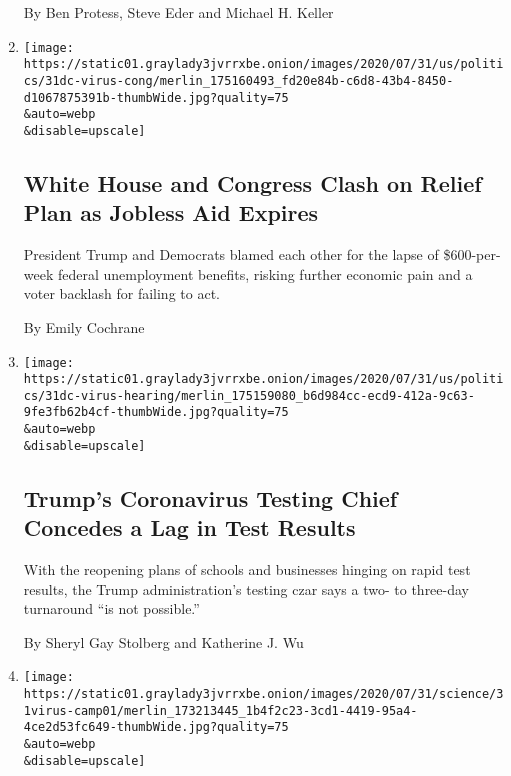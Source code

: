 \begin{enumerate}
  By Ben Protess, Steve Eder and Michael H. Keller
\item
  \href{/2020/07/31/us/politics/white-house-congress-relief-plan-jobless-aid.html}{}

  \texttt{[image: https://static01.graylady3jvrrxbe.onion/images/2020/07/31/us/politics/31dc-virus-cong/merlin\_175160493\_fd20e84b-c6d8-43b4-8450-d1067875391b-thumbWide.jpg?quality=75\\\&auto=webp\\\&disable=upscale]}

  \hypertarget{white-house-and-congress-clash-on-relief-plan-as-jobless-aid-expires}{%
  \subsection{White House and Congress Clash on Relief Plan as Jobless
  Aid
  Expires}\label{white-house-and-congress-clash-on-relief-plan-as-jobless-aid-expires}}

  President Trump and Democrats blamed each other for the lapse of
  \$600-per-week federal unemployment benefits, risking further economic
  pain and a voter backlash for failing to act.

  By Emily Cochrane
\item
  \href{/2020/07/31/us/politics/trump-coronavirus-testing.html}{}

  \texttt{[image: https://static01.graylady3jvrrxbe.onion/images/2020/07/31/us/politics/31dc-virus-hearing/merlin\_175159080\_b6d984cc-ecd9-412a-9c63-9fe3fb62b4cf-thumbWide.jpg?quality=75\\\&auto=webp\\\&disable=upscale]}

  \hypertarget{trumps-coronavirus-testing-chief-concedes-a-lag-in-test-results}{%
  \subsection{Trump's Coronavirus Testing Chief Concedes a Lag in Test
  Results}\label{trumps-coronavirus-testing-chief-concedes-a-lag-in-test-results}}

  With the reopening plans of schools and businesses hinging on rapid
  test results, the Trump administration's testing czar says a two- to
  three-day turnaround ``is not possible.''

  By Sheryl Gay Stolberg and Katherine J. Wu
\item
  \href{/2020/07/31/health/coronavirus-children-camp.html}{}

  \texttt{[image: https://static01.graylady3jvrrxbe.onion/images/2020/07/31/science/31virus-camp01/merlin\_173213445\_1b4f2c23-3cd1-4419-95a4-4ce2d53fc649-thumbWide.jpg?quality=75\\\&auto=webp\\\&disable=upscale]}


\end{enumerate}

